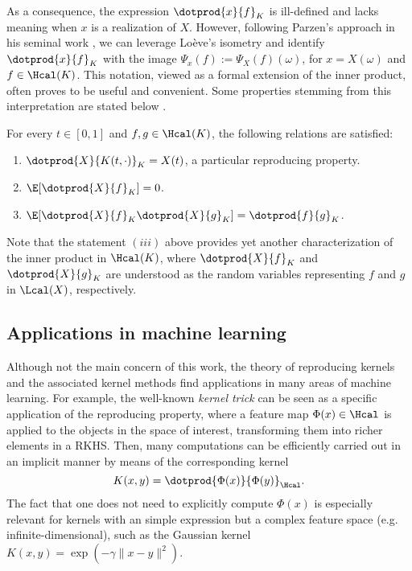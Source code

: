 As a consequence, the expression \(\dotprod{x}{f}_K\) is ill-defined and lacks meaning when \(x\) is a realization of \(X\). However, following Parzen's approach in his seminal work \citep[e.g.][Th.~4E]{parzen1961approach}, we can leverage Loève's isometry and identify \(\dotprod{x}{f}_K \) with the image \( \Psi_x(f) := \Psi_X(f)(\omega)\), for \(x=X(\omega)\) and \(f\in \Hcal(K)\). This notation, viewed as a formal extension of the inner product, often proves to be useful and convenient. Some properties stemming from this interpretation are stated below \citep[see][p.~974]{parzen1961approach}.

\begin{proposition}
  For every \(t\in[0,1]\) and \(f, g \in \Hcal(K)\), the following relations are satisfied:
\begin{enumerate}
  \item \(\dotprod{X}{K(t, \cdot)}_K = X(t)\), a particular reproducing property.
  \item \(\E[\dotprod{X}{f}_K] = 0\).
  \item \(\E[\dotprod{X}{f}_K\dotprod{X}{g}_K] = \dotprod{f}{g}_K\).
\end{enumerate}
\end{proposition}
Note that the statement \((iii)\) above provides yet another characterization of the inner product in \(\Hcal(K)\), where \(\dotprod{X}{f}_K\) and \(\dotprod{X}{g}_K\) are understood as the random variables representing \(f\) and \(g\) in \(\Lcal(X)\), respectively.


\subsection*{Applications in machine learning}

Although not the main concern of this work, the theory of reproducing kernels and the associated kernel methods find applications in many areas of machine learning. For example, the well-known \textit{kernel trick} can be seen as a specific application of the reproducing property, where a feature map \(\Phi(x) \in \Hcal\) is applied to the objects in the space of interest, transforming them into richer elements in a RKHS. Then, many computations can be efficiently carried out in an implicit manner by means of the corresponding kernel
\[
K(x, y)=\dotprod{\Phi(x)}{\Phi(y)}_{\Hcal}.
\]
The fact that one does not need to explicitly compute \(\Phi(x)\) is especially relevant for kernels with an simple expression but a complex feature space (e.g. infinite-dimensional), such as the Gaussian kernel \(K(x, y)=\exp(-\gamma\|x-y\|^2)\).

